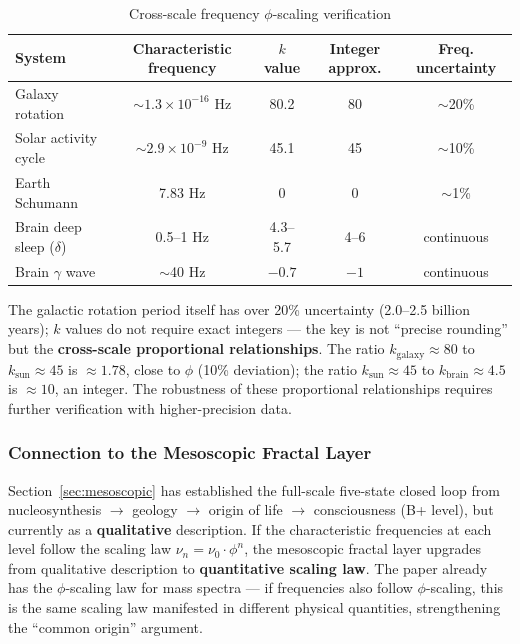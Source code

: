 \begin{table}[htbp]
\centering
\caption{Cross-scale frequency $\phi$-scaling verification}
\label{tab:cross_scale_en}
\begin{tabular}{lcccc}
\hline
System & Characteristic frequency & $k$ value & Integer approx. & Freq. uncertainty \\
\hline
Galaxy rotation & $\sim 1.3\times10^{-16}$ Hz & 80.2 & 80 & $\sim$20\% \\
Solar activity cycle & $\sim 2.9\times10^{-9}$ Hz & 45.1 & 45 & $\sim$10\% \\
Earth Schumann & 7.83 Hz & 0 & 0 & $\sim$1\% \\
Brain deep sleep ($\delta$) & 0.5--1 Hz & 4.3--5.7 & 4--6 & continuous \\
Brain $\gamma$ wave & $\sim$40 Hz & $-0.7$ & $-1$ & continuous \\
\hline
\end{tabular}
\end{table}

\begin{remark}
\label{rmk:cross_scale_caveat_en}
The galactic rotation period itself has over 20\% uncertainty (2.0--2.5 billion years); $k$ values do not require exact integers --- the key is not ``precise rounding'' but the \textbf{cross-scale proportional relationships}. The ratio $k_{\text{galaxy}}\approx 80$ to $k_{\text{sun}}\approx 45$ is $\approx 1.78$, close to $\phi$ (10\% deviation); the ratio $k_{\text{sun}}\approx 45$ to $k_{\text{brain}}\approx 4.5$ is $\approx 10$, an integer. The robustness of these proportional relationships requires further verification with higher-precision data.
\end{remark}

\subsubsection{Connection to the Mesoscopic Fractal Layer}

Section~\ref{sec:mesoscopic} has established the full-scale five-state closed loop from nucleosynthesis $\to$ geology $\to$ origin of life $\to$ consciousness (B+ level), but currently as a \textbf{qualitative} description. If the characteristic frequencies at each level follow the scaling law $\nu_n = \nu_0 \cdot \phi^n$, the mesoscopic fractal layer upgrades from qualitative description to \textbf{quantitative scaling law}. The paper already has the $\phi$-scaling law for mass spectra --- if frequencies also follow $\phi$-scaling, this is the same scaling law manifested in different physical quantities, strengthening the ``common origin'' argument.


